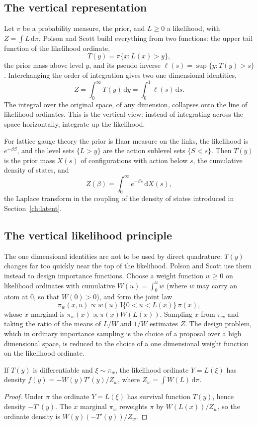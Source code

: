 \subsection{The vertical representation}

Let $\pi$ be a probability measure, the prior, and $L\ge0$ a likelihood, with $Z=\int L\,\mathrm d\pi$. Polson and Scott build everything from two functions: the upper tail function of the likelihood ordinate,
\[
T(y)=\pi\{x:L(x)>y\},
\]
the prior mass above level $y$, and its pseudo inverse $\ell(s)=\sup\{y:T(y)>s\}$. Interchanging the order of integration gives two one dimensional identities,
\[
Z=\int_0^\infty T(y)\,\mathrm dy=\int_0^1\ell(s)\,\mathrm ds .
\]
The integral over the original space, of any dimension, collapses onto the line of likelihood ordinates. This is the vertical view: instead of integrating across the space horizontally, integrate up the likelihood.

For lattice gauge theory the prior is Haar measure on the links, the likelihood is $e^{-\beta S}$, and the level sets $\{L>y\}$ are the action sublevel sets $\{S<s\}$. Then $T(y)$ is the prior mass $X(s)$ of configurations with action below $s$, the cumulative density of states, and
\[
Z(\beta)=\int_0^\infty e^{-\beta s}\,\mathrm dX(s),
\]
the Laplace transform in the coupling of the density of states introduced in Section~\ref{ch:latent}.

\subsection{The vertical likelihood principle}

The one dimensional identities are not to be used by direct quadrature: $T(y)$ changes far too quickly near the top of the likelihood. Polson and Scott use them instead to design importance functions. Choose a weight function $w\ge0$ on likelihood ordinates with cumulative $W(u)=\int_0^uw$ (where $w$ may carry an atom at $0$, so that $W(0)>0$), and form the joint law
\[
\pi_w(x,u)\propto w(u)\,\mathrm{I}\{0<u<L(x)\}\,\pi(x),
\]
whose $x$ marginal is $\pi_w(x)\propto\pi(x)W(L(x))$. Sampling $x$ from $\pi_w$ and taking the ratio of the means of $L/W$ and $1/W$ estimates $Z$. The design problem, which in ordinary importance sampling is the choice of a proposal over a high dimensional space, is reduced to the choice of a one dimensional weight function on the likelihood ordinate.

\begin{theorem}
If $T(y)$ is differentiable and $\xi\sim\pi_w$, the likelihood ordinate $Y=L(\xi)$ has density $f(y)=-W(y)T'(y)/Z_w$, where $Z_w=\int W(L)\,\mathrm d\pi$.
\end{theorem}
\begin{proof}
Under $\pi$ the ordinate $Y=L(\xi)$ has survival function $T(y)$, hence density $-T'(y)$. The $x$ marginal $\pi_w$ reweights $\pi$ by $W(L(x))/Z_w$, so the ordinate density is $W(y)(-T'(y))/Z_w$.
\end{proof}

